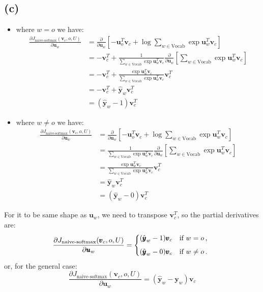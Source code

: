 \documentclass[12pt]{article}
\begin{document}
\subsection*{(c)}

\begin{itemize}
    \item where $w=o$ we have:
    \begin{align*}
        \frac{\partial J_{\text{naive-softmax}}(\pmb{v}_c, o, U)}{\partial \pmb{u}_w} &= \frac{\partial}{\partial \pmb{u}_w}[-\pmb{u}_o^T \pmb{v}_c + \log{\sum_{w \in \text{Vocab}}{\exp{\pmb{u}_w^T \pmb{v}_c}}}]\\
        &= -\pmb{v}_c^T + \frac{1}{\sum_{w \in \text{Vocab}}{\exp{\pmb{u}_w^T \pmb{v}_c}}} \frac{\partial}{\partial \pmb{u}_w}[\sum_{w \in \text{Vocab}}{\exp{\pmb{u}_w^T \pmb{v}_c}}]\\
        &= -\pmb{v}_c^T + \frac{\exp{\pmb{u}_w^T \pmb{v}_c}}{\sum_{w \in \text{Vocab}}{\exp{\pmb{u}_w^T \pmb{v}_c}}} \pmb{v}_c^T\\
        &= -\pmb{v}_c^T + \hat{\pmb{y}}_w \pmb{v}_c^T\\
        &= (\hat{\pmb{y}}_w - 1) \pmb{v}_c^T
    \end{align*}

    \item where $w \neq o$ we have:
    \begin{align*}
        \frac{\partial J_{\text{naive-softmax}}(\pmb{v}_c, o, U)}{\partial \pmb{u}_w} &= \frac{\partial}{\partial \pmb{u}_w}[-\pmb{u}_o^T \pmb{v}_c + \log{\sum_{w \in \text{Vocab}}{\exp{\pmb{u}_w^T \pmb{v}_c}}}]\\
        &= \frac{1}{\sum_{w \in \text{Vocab}}{\exp{\pmb{u}_w^T \pmb{v}_c}}} \frac{\partial}{\partial \pmb{u}_w}[\sum_{w \in \text{Vocab}}{\exp{\pmb{u}_w^T \pmb{v}_c}}]\\
        &= \frac{\exp{\pmb{u}_w^T \pmb{v}_c}}{\sum_{w \in \text{Vocab}}{\exp{\pmb{u}_w^T \pmb{v}_c}}} \pmb{v}_c^T\\
        &= \hat{\pmb{y}}_w \pmb{v}_c^T\\
        &= (\hat{\pmb{y}}_w - 0) \pmb{v}_c^T
    \end{align*}
\end{itemize}

For it to be same shape as $\pmb{u}_w$, we need to transpose $\pmb{v}_c^T$, so the partial derivatives are:
\begin{equation*}
\frac{\partial J_{\text{naive-softmax}}(\pmb{v}_c, o, U)}{\partial \pmb{u}_w} =
\begin{dcases*}
(\hat{\pmb{y}}_w - 1) \pmb{v}_c & if $w=o$\,, \\[1ex]
(\hat{\pmb{y}}_w - 0) \pmb{v}_c & if $w \neq o$\,.
\end{dcases*}
\end{equation*}
or, for the general case:
\begin{equation*}
    \frac{\partial J_{\text{naive-softmax}}(\pmb{v}_c, o, U)}{\partial \pmb{u}_w} = (\hat{\pmb{y}}_w - \pmb{y}_w) \pmb{v}_c
\end{equation*}
\end{document}
